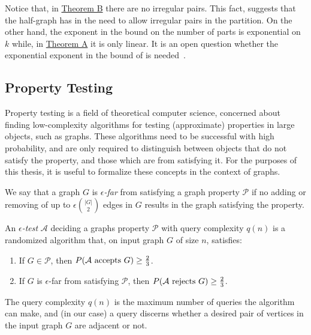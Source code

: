         Notice that, in \hyperref[thm:B]{Theorem B} there are no irregular pairs.
        This fact, suggests that the half-graph has in the need to allow irregular pairs in the partition.
        On the other hand, the exponent in the bound on the number of parts is exponential on $k$ while,
        in \hyperref[thm:A]{Theorem A} it is only linear.
        It is an open question whether the exponential exponent in the bound of  is
        needed~\cite{julia_wolf_private_comunication}.


    \subsection{Property Testing} \label{subsec:subsection_1.3}

    Property testing is a field of theoretical computer science, concerned about finding low-complexity algorithms
    for testing (approximate) properties in large objects, such as graphs.
    These algorithms need to be successful with high probability, and are only required to distinguish between objects
    that do not satisfy the property, and those which are  from satisfying it.
    For the purposes of this thesis, it is useful to formalize these concepts in the context of graphs.

    \begin{definition}
        We say that a graph $G$ is \emph{$\epsilon$-far} from satisfying a graph property $\mathcal{P}$ if no adding or
        removing of up to $\epsilon {|G| \choose 2}$ edges in $G$ results in the graph satisfying the property.
    \end{definition}

    \begin{definition} \label{def:epsilon_test}
        An \emph{$\epsilon$-test} $\mathcal{A}$ deciding a graphs property $\mathcal{P}$ with query complexity
        $q(n)$ is a randomized algorithm that, on input graph $G$ of size $n$,
        satisfies:
        \begin{enumerate}
            \item If $G \in \mathcal{P}$, then $P( \mathcal{A} \text{ accepts } G ) \geq \frac{2}{3}$.
            \item If $G$ is $\epsilon$-far from satisfying $\mathcal{P}$,
                then $P( \mathcal{A} \text{ rejects } G ) \geq \frac{2}{3}$.
        \end{enumerate}
        The query complexity $q(n)$ is the maximum number of queries the algorithm can make, and (in our case)
        a query discerns whether a desired pair of vertices in the input graph $G$ are adjacent or not.
    \end{definition}

